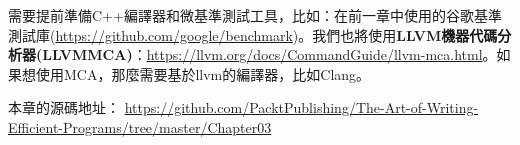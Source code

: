 需要提前準備C++編譯器和微基準測試工具，比如：在前一章中使用的谷歌基準測試庫(\url{https://github.com/google/benchmark})。我們也將使用\textbf{LLVM機器代碼分析器(LLVMMCA)}：\url{https://llvm.org/docs/CommandGuide/llvm-mca.html}。如果想使用MCA，那麼需要基於llvm的編譯器，比如Clang。

本章的源碼地址： \url{https://github.com/PacktPublishing/The-Art-of-Writing-Efficient-Programs/tree/master/Chapter03}